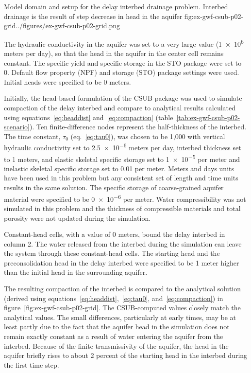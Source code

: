 \begin{StandardFigure}{
                                     Model domain and setup for the delay interbed drainage problem. Interbed 
                                     drainage is the result of step decrease in head in the aquifer
                                     }{fig:ex-gwf-csub-p02-grid}{../figures/ex-gwf-csub-p02-grid.png}
\end{StandardFigure}                                 

The hydraulic conductivity in the aquifer was set to a very large value (\num{1e6} meters per day), so that the head in the aquifer in the center cell remains constant. The specific yield and specific storage in the STO package were set to 0. Default flow property (NPF) and storage (STO) package settings were used. Initial heads were specified to be 0 meters.
 
Initially, the head-based formulation of the CSUB package was used to simulate compaction of the delay interbed and compare to analytical results calculated using equations~\ref{eq:headdist} and~\ref{eq:compaction} (table~\ref{tab:ex-gwf-csub-p02-scenario}). Ten finite-difference nodes represent the half-thickness of the interbed. The time constant, $\tau_0$ (eq.~\ref{eq:tau0}), was chosen to be 1,000 with vertical hydraulic conductivity set to \num{2.5e-6} meters per day, interbed thickness set to 1 meters, and elastic skeletal specific storage set to \num{1e-5} per meter and inelastic skeletal specific storage set to 0.01 per meter. Meters and days units have been used in this problem but any consistent set of length and time units results in the same solution. The specific storage of coarse-grained aquifer material were specified to be \num{0e-6} per meter. Water compressibility was not simulated in this problem and the thickness of compressible materials and total porosity were not updated during the simulation. 


 
Constant-head cells, with a value of 0 meters, bound the delay interbed in column 2. The water released from the interbed during the simulation can leave the system through these constant-head cells. The starting head and the preconsolidation head in the delay interbed were specified to be 1 meter higher than the initial head in the surrounding aquifer. 

The resulting compaction of the interbed is compared to the analytical solution (derived using equations~\ref{eq:headdist},~\ref{eq:tau0}, and~\ref{eq:compaction}) in figure~\ref{fig:ex-gwf-csub-p02-grid}. The CSUB-computed values closely match the analytical values. The small differences, particularly at early times, may be at least partly due to the fact that the aquifer head in the simulation does not remain exactly constant as a result of water entering the aquifer from the interbed. Because of the finite transmissivity of the aquifer, the head in the aquifer briefly rises to about 2 percent of the starting head in the interbed during the first time step.

